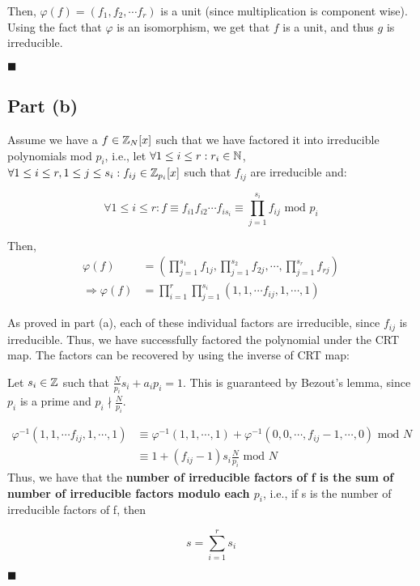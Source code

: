 Then, $\varphi(f) = (f_1, f_2, \cdots f_r)$ is a unit (since multiplication is component wise). Using the fact that $\varphi$ is an isomorphism, we get that $f$ is a unit, and thus $g$ is irreducible.

\hfill$\blacksquare$

\subsection{Part (b)}

Assume we have a $f \in \mathbb{Z}_N[x]$ such that we have factored it into irreducible polynomials mod $p_i$, i.e., let $\forall 1 \le i \le r: r_i \in \mathbb{N}$, $\forall 1 \le i \le r, 1 \le j \le s_i: f_{ij} \in \mathbb{Z}_{p_i}[x]$ such that $f_{ij}$ are irreducible and:

\[
\forall 1 \le i \le r: f \equiv f_{i1} f_{i2} \cdots f_{i s_i} \equiv \prod_{j = 1}^{s_i} f_{ij} \text{ mod } p_i
\]

Then, 
\begin{align*}
    \varphi(f) &= \left(\prod_{j = 1}^{s_1} f_{1j}, \prod_{j = 1}^{s_2} f_{2j}, \cdots, \prod_{j = 1}^{s_r} f_{rj} \right) \\
    \Rightarrow \varphi(f) &= \prod_{i=1}^r \prod_{j=1}^{s_i} \left(1, 1, \cdots f_{ij}, 1, \cdots, 1 \right)
\end{align*}

As proved in part (a), each of these individual factors are irreducible, since $f_{ij}$ is irreducible. Thus, we have successfully factored the polynomial under the CRT map. The factors can be recovered by using the inverse of CRT map:

Let $s_i \in \mathbb{Z}$ such that $\frac{N}{p_i} s_i + a_i p_i = 1$. This is guaranteed by Bezout's lemma, since $p_i$ is a prime and $p_i \nmid \frac{N}{p_i}$.

\begin{align*}
\varphi^{-1}\left(1, 1, \cdots f_{ij}, 1, \cdots, 1 \right) &\equiv \varphi^{-1}(1, 1, \cdots, 1) + \varphi^{-1}(0, 0, \cdots, f_{ij}-1, \cdots, 0) \text{ mod } N\\
&\equiv 1 + \left(f_{ij} - 1 \right) s_i \frac{N}{p_i} \text{ mod } N
\end{align*}
Thus, we have that the \textbf{number of irreducible factors of f is the sum of number of irreducible factors modulo each $p_i$}, i.e., if s is the number of irreducible factors of f, then

\[
s = \sum_{i=1}^r s_i
\]

\hfill$\blacksquare$